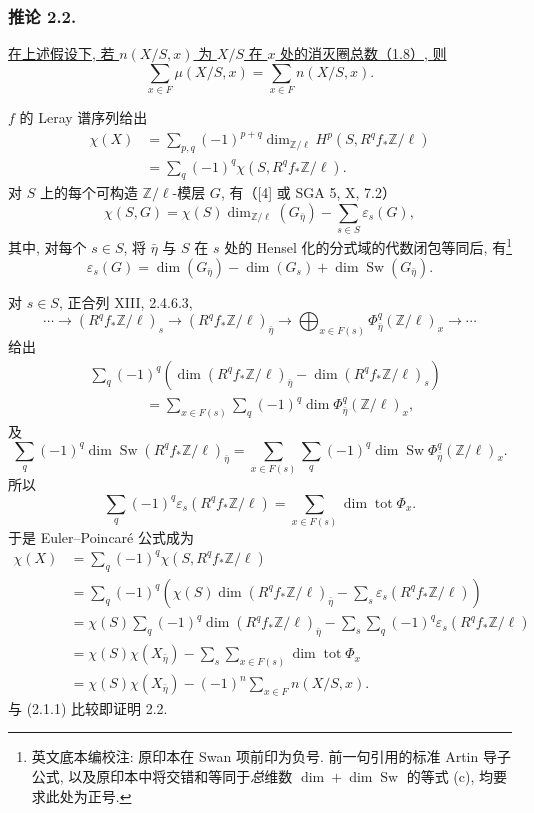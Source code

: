\subsubsection*{推论 2.2.}
\underline{在上述假设下, 若 $n(X/S,x)$ 为 $X/S$ 在 $x$ 处的消灭圈总数（1.8）, 则}
\[
\sum_{x\in F}\mu(X/S,x)=\sum_{x\in F}n(X/S,x).
\]

$f$ 的 Leray 谱序列给出
\begin{align*}
\chi(X)
&=\sum_{p,q}(-1)^{p+q}
\dim_{\mathbb Z/\ell}H^p(S,R^qf_*\mathbb Z/\ell)\\
&=\sum_q(-1)^q\chi(S,R^qf_*\mathbb Z/\ell).
\end{align*}
对 $S$ 上的每个可构造 $\mathbb Z/\ell$-模层 $G$, 有（[4] 或 SGA 5, X, 7.2）
\[
\chi(S,G)=\chi(S)\dim_{\mathbb Z/\ell}(G_{\bar\eta})
-\sum_{s\in S}\varepsilon_s(G),
\]
其中, 对每个 $s\in S$, 将 $\bar\eta$ 与 $S$ 在 $s$ 处的 Hensel 化的分式域的代数闭包等同后, 有\footnote{英文底本编校注: 原印本在 Swan 项前印为负号. 前一句引用的标准 Artin 导子公式, 以及原印本中将交错和等同于\emph{总}维数 $\dim+\dim\operatorname{Sw}$ 的等式 (c), 均要求此处为正号.}
\[
\varepsilon_s(G)=
\dim(G_{\bar\eta})-\dim(G_s)+\dim\operatorname{Sw}(G_{\bar\eta}).
\]

对 $s\in S$, 正合列 XIII, 2.4.6.3,
\[
\cdots\longrightarrow(R^qf_*\mathbb Z/\ell)_s
\longrightarrow(R^qf_*\mathbb Z/\ell)_{\bar\eta}
\longrightarrow\bigoplus_{x\in F(s)}
\Phi^q_{\bar\eta}(\mathbb Z/\ell)_x
\longrightarrow\cdots
\]
给出
\begin{align*}
&\sum_q(-1)^q\left(
\dim(R^qf_*\mathbb Z/\ell)_{\bar\eta}
-\dim(R^qf_*\mathbb Z/\ell)_s\right)\\
&\hspace{4em}=\sum_{x\in F(s)}\sum_q(-1)^q
\dim\Phi^q_{\bar\eta}(\mathbb Z/\ell)_x,
\end{align*}
及
\[
\sum_q(-1)^q\dim\operatorname{Sw}
(R^qf_*\mathbb Z/\ell)_{\bar\eta}
=\sum_{x\in F(s)}\sum_q(-1)^q
\dim\operatorname{Sw}\Phi^q_{\bar\eta}(\mathbb Z/\ell)_x.
\]
所以
\begin{equation}\tag{c}
\sum_q(-1)^q\varepsilon_s(R^qf_*\mathbb Z/\ell)
=\sum_{x\in F(s)}\dim\operatorname{tot}\Phi_x.
\end{equation}
于是 Euler--Poincar\'e 公式成为
\begin{align*}
\chi(X)
&=\sum_q(-1)^q\chi(S,R^qf_*\mathbb Z/\ell)\\
&=\sum_q(-1)^q\left(
\chi(S)\dim(R^qf_*\mathbb Z/\ell)_{\bar\eta}
-\sum_s\varepsilon_s(R^qf_*\mathbb Z/\ell)\right)\\
&=\chi(S)\sum_q(-1)^q
\dim(R^qf_*\mathbb Z/\ell)_{\bar\eta}
-\sum_s\sum_q(-1)^q\varepsilon_s(R^qf_*\mathbb Z/\ell)\\
&=\chi(S)\chi(X_{\bar\eta})
-\sum_s\sum_{x\in F(s)}\dim\operatorname{tot}\Phi_x\\
&=\chi(S)\chi(X_{\bar\eta})
-(-1)^n\sum_{x\in F}n(X/S,x).
\end{align*}
与 (2.1.1) 比较即证明 2.2.
